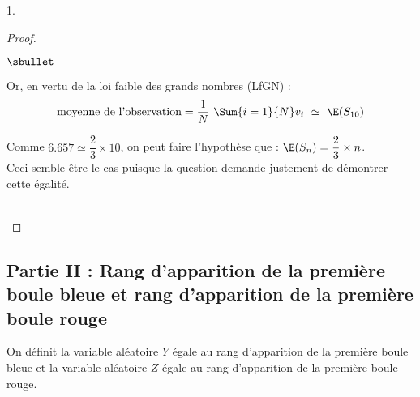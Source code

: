 \begin{noliste}{1.}
\begin{proof}
\begin{noliste}{$\sbullet$}
    \item Or, en vertu de la loi faible des grands nombres (LfGN) :
        \[
        \mbox{moyenne de l'observation} = \dfrac{1}{N} \ \Sum{i =
          1}{N} v_i \ \simeq \ \E(S_{10})
        \]

    \end{noliste}


    \newpage


    \begin{remarkL}{.97}
      Comme $6.657 \simeq \dfrac{2}{3} \times 10$, on peut faire
      l'hypothèse que : $\E(S_n) = \dfrac{2}{3} \times n$.\\
      Ceci semble être le cas puisque la question  demande
      justement de démontrer cette égalité.
    \end{remarkL}~\\[-1.4cm]
  \end{proof}
\end{noliste}

\subsection*{Partie II : Rang d'apparition de la première boule bleue 
et rang d'apparition de la première boule rouge}

\noindent 
On définit la variable aléatoire $Y$ égale au rang d'apparition de la
première boule bleue et la variable aléatoire $Z$ égale au rang
d'apparition de la première boule rouge.

